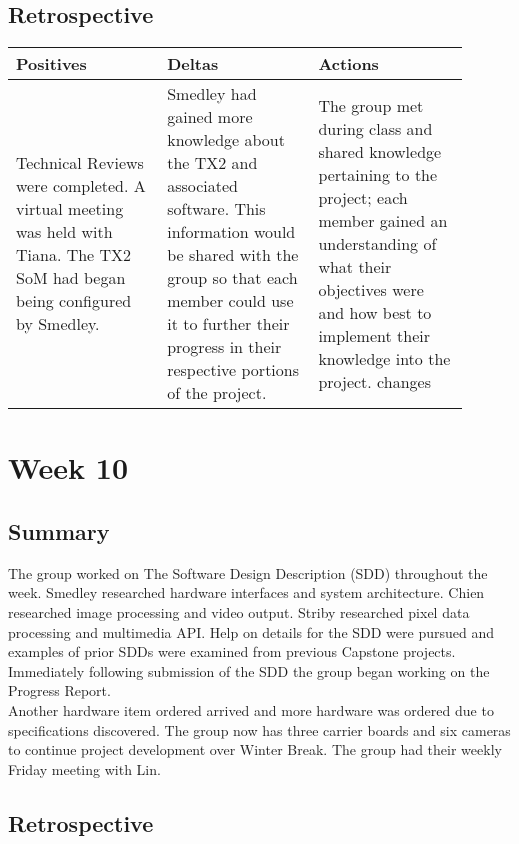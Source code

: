 \documentclass[letterpaper,10pt,serif,draftclsnofoot,onecolumn,compsoc,titlepage]{IEEEtran}
\begin{document}
\subsection{Retrospective}

\begin{tabular}{|p{0.3\linewidth}|p{0.3\linewidth}|p{0.3\linewidth}|}
   \hline
   \textbf{Positives} & \textbf{Deltas} & \textbf{Actions}\\ 
   \hline
   Technical Reviews were completed. A virtual meeting was held with Tiana. The 
   TX2 SoM had began being configured by Smedley.  
   & 
   Smedley had gained more knowledge about the TX2 and associated software. This information would be shared with the group so that each member could use it to further their progress in their respective portions of the project.
   & 
   The group met during class and shared knowledge pertaining to the project; each member gained an understanding of what their objectives were and how best to implement their knowledge into the project.
   changes \\
   \hline
\end{tabular}

\section{Week 10}

\subsection{Summary}

The group worked on The Software Design Description (SDD) throughout the week. Smedley 
researched hardware interfaces and system architecture. Chien researched image 
processing and video output. Striby researched pixel data processing and multimedia 
API. Help on details for the SDD were pursued and examples of prior SDDs were examined 
from previous Capstone projects. Immediately following submission of the SDD the 
group began working on the Progress Report. \\

Another hardware item ordered arrived and more hardware was ordered due to 
specifications discovered. The group now has three carrier boards and six cameras to 
continue project development over Winter Break. The group had their weekly Friday 
meeting with Lin.\\

\subsection{Retrospective}
\end{document}
